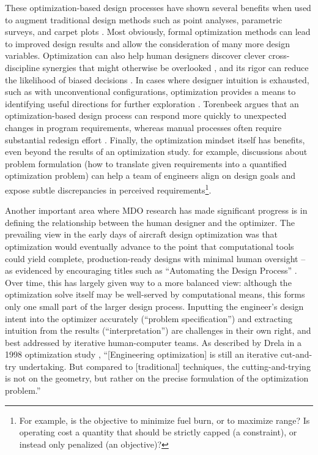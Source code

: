 These optimization-based design processes have shown several benefits when used to augment traditional design methods such as point analyses, parametric surveys, and carpet plots \cite{torenbeek_advanced_2013}. Most obviously, formal optimization methods can lead to improved design results and allow the consideration of many more design variables. Optimization can also help human designers discover clever cross-discipline synergies that might otherwise be overlooked \cite{drela_pros_1998}, and its rigor can reduce the likelihood of biased decisions \cite{torenbeek_advanced_2013}. In cases where designer intuition is exhausted, such as with unconventional configurations, optimization provides a means to identifying useful directions for further exploration \cite{drela_pros_1998}. Torenbeek argues that an optimization-based design process can respond more quickly to unexpected changes in program requirements, whereas manual processes often require substantial redesign effort \cite{torenbeek_advanced_2013}. Finally, the optimization mindset itself has benefits, even beyond the results of an optimization study. for example, discussions about problem formulation (how to translate given requirements into a quantified optimization problem) can help a team of engineers align on design goals and expose subtle discrepancies in perceived requirements\footnote{For example, is the objective to minimize fuel burn, or to maximize range? Is operating cost a quantity that should be strictly capped (a constraint), or instead only penalized (an objective)?}.

Another important area where MDO research has made significant progress is in defining the relationship between the human designer and the optimizer. The prevailing view in the early days of aircraft design optimization was that optimization would eventually advance to the point that computational tools could yield complete, production-ready designs with minimal human oversight -- as evidenced by encouraging titles such as ``Automating the Design Process'' \cite{heldenfels_automating_1973, heldenfels_automation_1974, vanderplaats_automated_1976}. Over time, this has largely given way to a more balanced view: although the optimization solve itself may be well-served by computational means, this forms only one small part of the larger design process. Inputting the engineer's design intent into the optimizer accurately (``problem specification'') and extracting intuition from the results (``interpretation'') are challenges in their own right, and best addressed by iterative human-computer teams. As described by Drela in a 1998 optimization study \cite{drela_pros_1998}, ``[Engineering optimization] is still an iterative cut-and-try undertaking. But compared to [traditional] techniques, the cutting-and-trying is not on the geometry, but rather on the precise formulation of the optimization problem.''

